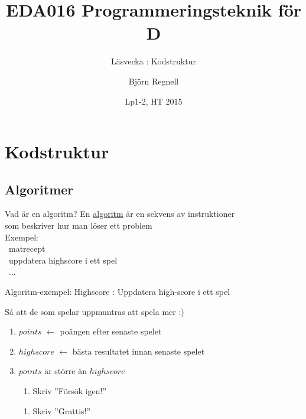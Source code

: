 \documentclass{lecturenotes}
\title[Föreläsningsanteckningar EDA016, 2015]{EDA016 Programmeringsteknik för D}
\subtitle{Läsvecka \vecka: Kodstruktur}
\author{Björn Regnell}
\institute{Datavetenskap, LTH}
\date{Lp1-2, HT 2015}
\renewcommand{\vecka}{2}
\begin{document}
\frame{\titlepage}
\section[Vecka \vecka: Kodstruktur]{Kodstruktur}
\frame{\tableofcontents}

\subsection{Algoritmer}

\begin{Slide}{Vad är en algoritm?}
En \href{https://sv.wikipedia.org/wiki/Algoritm}{algoritm} är en sekvens av instruktioner\\ som beskriver hur man löser ett problem \\
\vspace{2em}
Exempel: \\ ~matrecept \\ \pause ~uppdatera highscore i ett spel \\ ~...
\end{Slide}

\begin{Slide}{Algoritm-exempel: Highscore}
: Uppdatera high-score i ett spel \\ \vspace{1em}

 \pause Så att de som spelar uppmuntras att spela mer :) \\ \vspace{1em}

\pause
\begin{enumerate}
\item $points$ $\leftarrow$ poängen efter senaste spelet
\item $highscore$ $\leftarrow$ bästa resultatet innan senaste spelet
\item {} $points$ är större än $highscore$ 
\begin{enumerate}[ ~~]
\item  Skriv ''Försök igen!''
\end{enumerate}
\begin{enumerate}[ ~~]
\item  Skriv ''Grattis!''
\end{enumerate}
\end{enumerate}
\pause
\scriptsize {}
\end{Slide}
\end{document}
